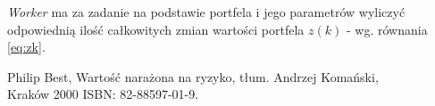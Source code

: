 \documentclass[12pt,titlepage]{article}
\numberwithin{equation}{section}
\begin{document}
\textit{Worker} ma za zadanie na podstawie portfela i jego parametrów wyliczyć odpowiednią ilość całkowitych zmian wartości portfela $z(k)$ - wg. równania \eqref{eq:zk}.












\newpage



Philip Best, Wartość narażona na ryzyko, tłum. Andrzej Komański,
\\
Kraków 2000 ISBN: 82-88597-01-9.
\end{document}
